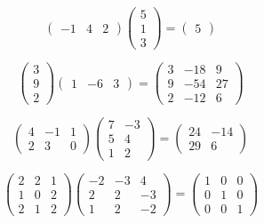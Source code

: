 \begin{solution}
    \begin{ppart}
        \[\begin{pmatrix}
            -1 & 4 & 2
        \end{pmatrix}
        \begin{pmatrix}
            5\\
            1\\
            3
        \end{pmatrix} = \begin{pmatrix}
            5
        \end{pmatrix}\]
    \end{ppart}
    \begin{ppart}
        \[\begin{pmatrix}
            3\\
            9\\
            2
        \end{pmatrix}
        \begin{pmatrix}
            1 & -6 & 3
        \end{pmatrix} = \begin{pmatrix}
            3 & -18 & 9\\
            9 & -54 & 27\\
            2 & -12 & 6
        \end{pmatrix}\]
    \end{ppart}
    \begin{ppart}
        \[\begin{pmatrix}
            4 & -1 & 1\\2&3&0
        \end{pmatrix}
        \begin{pmatrix}
            7 & -3\\
            5 & 4\\
            1 & 2
        \end{pmatrix} = \begin{pmatrix}
            24 & -14\\
            29 & 6
        \end{pmatrix}\]
    \end{ppart}
    \begin{ppart}
        \[\begin{pmatrix}
            2 & 2 & 1\\1 & 0 & 2\\2 & 1 & 2
        \end{pmatrix}
        \begin{pmatrix}
            -2 & -3 & 4\\2 & 2 & -3\\1 & 2 & -2
        \end{pmatrix} = \begin{pmatrix}
            1 & 0 & 0\\
            0 & 1 & 0\\
            0 & 0 & 1
        \end{pmatrix}\]
    \end{ppart}
\end{solution}

